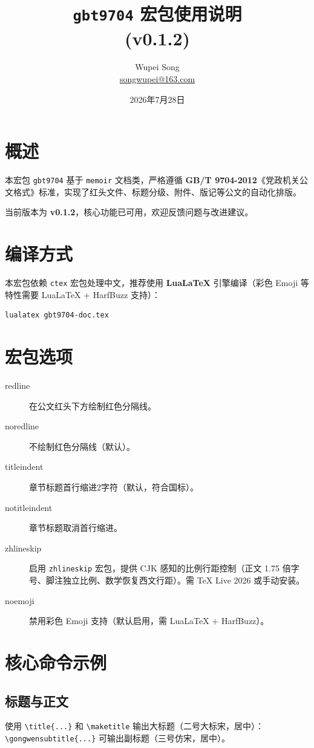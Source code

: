 \documentclass[redline, titleindent, zhlineskip]{gbt9704}
\title{\texttt{gbt9704} 宏包使用说明 \\ (v0.1.2)}
\author{Wupei Song \\ \small{\url{songwupei@163.com}}}
\date{2026年7月28日}
\begin{document}
\maketitle

\tableofcontents

\section{概述}
本宏包 \texttt{gbt9704} 基于 \texttt{memoir} 文档类，严格遵循 \textbf{GB/T 9704-2012}《党政机关公文格式》标准，实现了红头文件、标题分级、附件、版记等公文的自动化排版。

当前版本为 \textbf{v0.1.2}，核心功能已可用，欢迎反馈问题与改进建议。

\section{编译方式}
本宏包依赖 \texttt{ctex} 宏包处理中文，推荐使用 \textbf{LuaLaTeX} 引擎编译（彩色 Emoji 等特性需要 LuaLaTeX + HarfBuzz 支持）：
\begin{verbatim}
lualatex gbt9704-doc.tex
\end{verbatim}

\section{宏包选项}
\begin{description}
  \item[redline] 在公文红头下方绘制红色分隔线。
  \item[noredline] 不绘制红色分隔线（默认）。
  \item[titleindent] 章节标题首行缩进2字符（默认，符合国标）。
  \item[notitleindent] 章节标题取消首行缩进。
  \item[zhlineskip] 启用 \texttt{zhlineskip} 宏包，提供 CJK 感知的比例行距控制（正文 1.75 倍字号、脚注独立比例、数学恢复西文行距）。需 TeX Live 2026 或手动安装。
  \item[noemoji] 禁用彩色 Emoji 支持（默认启用，需 LuaLaTeX + HarfBuzz）。
\end{description}

\section{核心命令示例}

\subsection{标题与正文}
使用 \verb|\title{...}| 和 \verb|\maketitle| 输出大标题（二号大标宋，居中）：
\verb|\gongwensubtitle{...}| 可输出副标题（三号仿宋，居中）。
\end{document}
